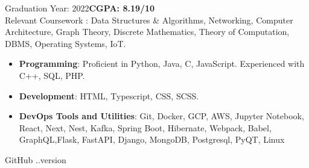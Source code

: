 \documentclass[10pt,a4paper,ragged2e]{classes/altacv}
\begin{document}


Graduation Year: 2022\hspace{5mm}\textbf{CGPA: 8.19/10 }\\
\smallskip
Relevant Coursework : Data Structures \& Algorithms, Networking, Computer Architecture, Graph Theory, Discrete Mathematics, Theory of Computation, DBMS, Operating Systems, IoT.



\smallskip
\begin{itemize}
\item \textbf{Programming}: Proficient in Python, Java, C, JavaScript. Experienced with C++, SQL, PHP.
\smallskip
\item \textbf{Development}: HTML, Typescript, CSS, SCSS.
\smallskip
\item \textbf{DevOps Tools and Utilities}: Git, Docker, GCP, AWS, Jupyter Notebook, React, Next, Nest, Kafka, Spring Boot, Hibernate, Webpack, Babel, GraphQL,Flask, FastAPI, Django, MongoDB, Postgresql, PyQT, Linux  
\smallskip
\end{itemize}

\smallskip
\begin{footnotesize}
GitHub \number \month .\number\year.version
\end{footnotesize}
\clearpage
\end{document}

